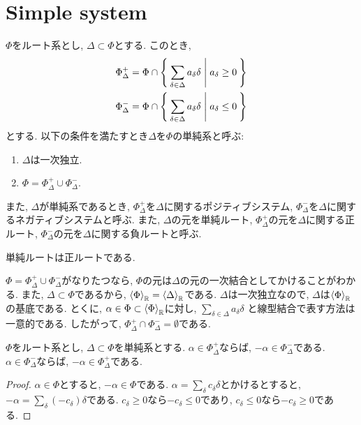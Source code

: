 \section{Simple system}
\begin{definition}
  $\Phi$をルート系とし, $\Delta\subset\Phi$とする.
  このとき,
  \begin{align*}
    \Phi_{\Delta}^{+}&=\Phi\cap \Set{\sum_{\delta\in\Delta}a_\delta \delta|a_\delta \geq 0}\\
    \Phi_{\Delta}^{-}&=\Phi\cap \Set{\sum_{\delta\in\Delta}a_\delta \delta|a_\delta \leq 0}
  \end{align*}
  とする.
  以下の条件を満たすとき$\Delta$を$\Phi$の単純系と呼ぶ:
  \begin{enumerate}
  \item $\Delta$は一次独立. %
  \item $\Phi = \Phi_\Delta^{+}\cup \Phi_\Delta^{-}$.
  \end{enumerate}
  また, $\Delta$が単純系であるとき,
  $\Phi_{\Delta}^+$を$\Delta$に関するポジティブシステム,
  $\Phi_{\Delta}^-$を$\Delta$に関するネガティブシステムと呼ぶ.
  また,
  $\Delta$の元を単純ルート,
  $\Phi_{\Delta}^+$の元を$\Delta$に関する正ルート,
  $\Phi_{\Delta}^-$の元を$\Delta$に関する負ルートと呼ぶ.
\end{definition}
\begin{remark}
  単純ルートは正ルートである.
\end{remark}
\begin{remark}
  $\Phi = \Phi_\Delta^{+}\cup \Phi_\Delta^{-}$がなりたつなら, $\Phi$の元は$\Delta$の元の一次結合としてかけることがわかる.
  また, $\Delta\subset\Phi$であるから,
  $\Braket{\Phi}_{\mathbb{R}}=\Braket{\Delta}_{\mathbb{R}}$である.
  $\Delta$は一次独立なので, $\Delta$は$\Braket{\Phi}_{\mathbb{R}}$の基底である.
  とくに,
  $\alpha\in\Phi\subset \Braket{\Phi}_{\mathbb{R}}$に対し,
  $\sum_{\delta\in\Delta}a_\delta \delta$
  と線型結合で表す方法は一意的である.
  したがって,
  $\Phi_{\Delta}^+\cap\Phi_{\Delta}^-=\emptyset$である.
\end{remark}
\begin{prop}
  \label{prop:posinega}
  $\Phi$をルート系とし, $\Delta\subset\Phi$を単純系とする.
  $\alpha\in\Phi_\Delta^+$ならば, $-\alpha\in\Phi_\Delta^-$である.
  $\alpha\in\Phi_\Delta^-$ならば, $-\alpha\in\Phi_\Delta^+$である.
\end{prop}
\begin{proof}
  $\alpha\in\Phi$とすると,
  $-\alpha\in\Phi$である.
  $\alpha=\sum_{\delta}c_\delta\delta$とかけるとすると,
  $-\alpha=\sum_{\delta}(-c_\delta)\delta$である.
  $c_\delta\geq 0$なら$-c_\delta\leq 0$であり,
  $c_\delta\leq 0$なら$-c_\delta\geq 0$である.  
\end{proof}
